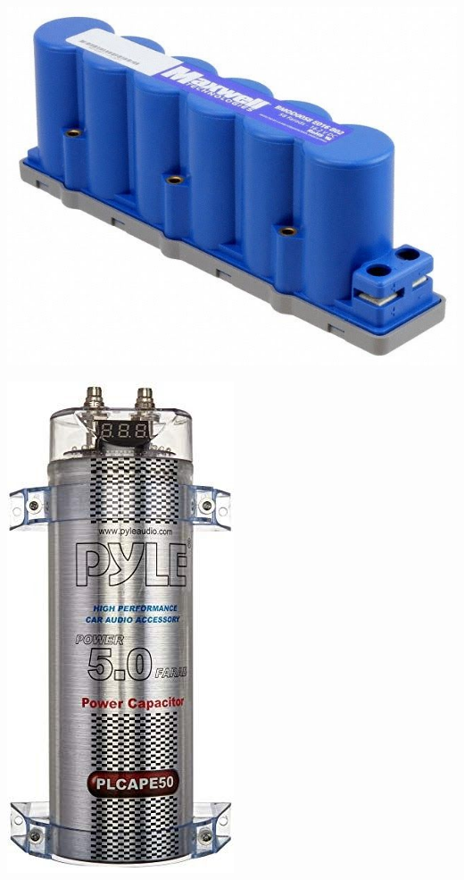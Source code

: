\documentclass{article}
\theoremstyle{definition}
\theoremstyle{definition}
\theoremstyle{remark}
\begin{document}
      \begin{center}
        \includegraphics[width=0.15\paperwidth]{../Images/image_3_3_(capacitor_1).png}
      \end{center}

      \begin{center}
        \includegraphics[width=0.10\paperwidth]{../Images/image_3_4_(capacitor_2).png}
      \end{center}
\end{document}
